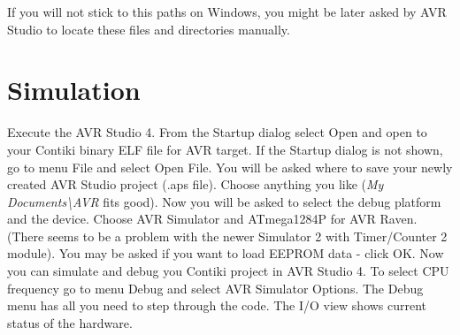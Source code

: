 \documentclass{article}
\begin{document}
If you will not stick to this paths on Windows,
you might be later asked by AVR Studio to locate these files and directories manually.


\section{Simulation}
Execute the AVR Studio 4. From the Startup dialog select Open and open to your Contiki binary ELF file for AVR target.
If the Startup dialog is not shown, go to menu File and select Open File.
You will be asked where to save your newly created AVR Studio project (.aps file).
Choose anything you like ({\it{My Documents\textbackslash AVR}} fits good).
Now you will be asked to select the debug platform and the device.
Choose AVR Simulator and ATmega1284P for AVR Raven. (There seems to be a problem with the newer Simulator 2 with Timer/Counter 2 module).
You may be asked if you want to load EEPROM data - click OK.
Now you can simulate and debug you Contiki project in AVR Studio 4.
To select CPU frequency go to menu Debug and select AVR Simulator Options.
The Debug menu has all you need to step through the code. The I/O view shows current status of the hardware.
\end{document}
